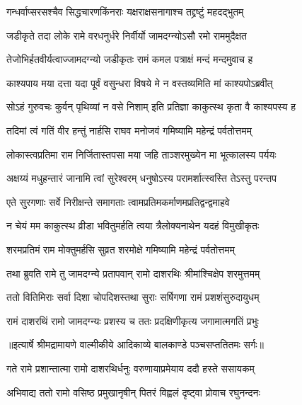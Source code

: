 \twolineshloka
{गन्धर्वाप्सरसश्चैव सिद्धचारणकिंनराः}
{यक्षराक्षसनागाश्च तद्द्रष्टुं महदद्भुतम्} %

\twolineshloka
{जडीकृते तदा लोके रामे वरधनुर्धरे}
{निर्वीर्यो जामदग्न्योऽसौ रमो राममुदैक्षत} %

\twolineshloka
{तेजोभिर्हतवीर्यत्वाज्जामदग्न्यो जडीकृतः}
{रामं कमल पत्राक्षं मन्दं मन्दमुवाच ह} %

\twolineshloka
{काश्यपाय मया दत्ता यदा पूर्वं वसुन्धरा}
{विषये मे न वस्तव्यमिति मां काश्यपोऽब्रवीत्} %

\twolineshloka
{सोऽहं गुरुवचः कुर्वन् पृथिव्यां न वसे निशाम्}
{इति प्रतिज्ञा काकुत्स्थ कृता वै काश्यपस्य ह} %

\twolineshloka
{तदिमां त्वं गतिं वीर हन्तुं नार्हसि राघव}
{मनोजवं गमिष्यामि महेन्द्रं पर्वतोत्तमम्} %

\twolineshloka
{लोकास्त्वप्रतिमा राम निर्जितास्तपसा मया}
{जहि ताञ्शरमुख्येन मा भूत्कालस्य पर्ययः} %

\twolineshloka
{अक्षय्यं मधुहन्तारं जानामि त्वां सुरेश्वरम्}
{धनुषोऽस्य परामर्शात्स्वस्ति तेऽस्तु परन्तप} %

\twolineshloka
{एते सुरगणाः सर्वे निरीक्षन्ते समागताः}
{त्वामप्रतिमकर्माणमप्रतिद्वन्द्वमाहवे} %

\twolineshloka
{न चेयं मम काकुत्स्थ व्रीडा भवितुमर्हति}
{त्वया त्रैलोक्यनाथेन यदहं विमुखीकृतः} %

\twolineshloka
{शरमप्रतिमं राम मोक्तुमर्हसि सुव्रत}
{शरमोक्षे गमिष्यामि महेन्द्रं पर्वतोत्तमम्} %

\twolineshloka
{तथा ब्रुवति रामे तु जामदग्न्ये प्रतापवान्}
{रामो दाशरथिः श्रीमांश्चिक्षेप शरमुत्तमम्} %

\twolineshloka
{ततो वितिमिराः सर्वा दिशा चोपदिशस्तथा}
{सुराः सर्षिगणा रामं प्रशशंसुरुदायुधम्} %

\twolineshloka
{रामं दाशरथिं रामो जामदग्न्यः प्रशस्य च}
{ततः प्रदक्षिणीकृत्य जगामात्मगतिं प्रभुः} %


{॥इत्यार्षे श्रीमद्रामायणे वाल्मीकीये आदिकाव्ये बालकाण्डे पञ्चसप्ततितमः सर्गः॥}


\twolineshloka
{गते रामे प्रशान्तात्मा रामो दाशरथिर्धनुः}
{वरुणायाप्रमेयाय ददौ हस्ते ससायकम्} %

\twolineshloka
{अभिवाद्य ततो रामो वसिष्ठ प्रमुखानृषीन्}
{पितरं विह्वलं दृष्ट्वा प्रोवाच रघुनन्दनः} %

